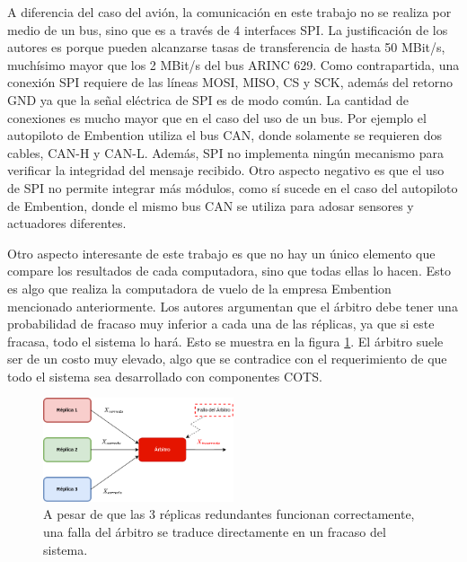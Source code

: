 A diferencia del caso del avión, la comunicación en este trabajo no se realiza por medio de un bus, sino que es a través de 4 interfaces SPI. La justificación de los autores es porque pueden alcanzarse tasas de transferencia de hasta 50 MBit/s, muchísimo mayor que los 2 MBit/s del bus ARINC 629. Como contrapartida, una conexión SPI requiere de las líneas MOSI, MISO, CS y SCK, además del retorno GND ya que la señal eléctrica de SPI es de modo común. La cantidad de conexiones es mucho mayor que en el caso del uso de un bus. Por ejemplo el autopiloto de Embention utiliza el bus CAN, donde solamente se requieren dos cables, CAN-H y CAN-L. Además, SPI no implementa ningún mecanismo para verificar la integridad del mensaje recibido. Otro aspecto negativo es que el uso de SPI no permite integrar más módulos, como sí sucede en el caso del autopiloto de Embention, donde el mismo bus CAN se utiliza para adosar sensores y actuadores diferentes.


Otro aspecto interesante de este trabajo es que no hay un único elemento que compare los resultados de cada computadora, sino que todas ellas lo hacen. Esto es algo que realiza la computadora de vuelo de la empresa Embention mencionado anteriormente. Los autores argumentan que el árbitro debe tener una probabilidad de fracaso muy inferior a cada una de las réplicas, ya que si este fracasa, todo el sistema lo hará. Esto se muestra en la figura \ref{fig:falla_arbitro}. El árbitro suele ser de un costo muy elevado, algo que se contradice con el requerimiento de que todo el sistema sea desarrollado con componentes COTS.

\begin{figure}[htb]
    \centering
    \includegraphics[width=0.5\textwidth]{img/falla_arbitro.png}
    \caption{A pesar de que las 3 réplicas redundantes funcionan correctamente, una falla del árbitro se traduce directamente en un fracaso del sistema.}
    \label{fig:falla_arbitro}
\end{figure}

